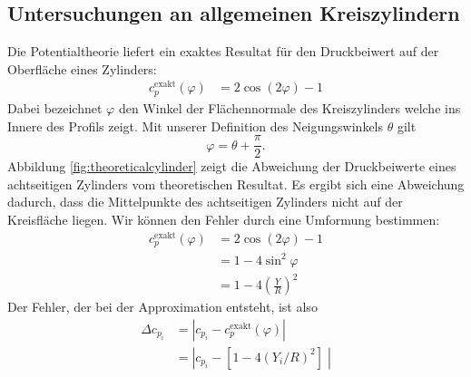 \subsection{Untersuchungen an allgemeinen Kreiszylindern} \label{chap:analyticalcylinder}
Die Potentialtheorie liefert ein exaktes Resultat für den Druckbeiwert auf der Oberfläche eines Zylinders:
\begin{align}
c_p^\mathrm{exakt} (\varphi ) &=  2 \cos{(2\varphi )} -1
\end{align}
Dabei bezeichnet $\varphi$ den Winkel der Flächennormale des Kreiszylinders welche ins Innere des Profils zeigt. Mit unserer Definition des Neigungswinkels $\theta$ gilt
\begin{equation}
\varphi = \theta +  \frac{\pi }{2}.
\end{equation}
Abbildung \ref{fig:theoreticalcylinder} zeigt die Abweichung der Druckbeiwerte eines achtseitigen Zylinders vom theoretischen Resultat. Es ergibt sich eine Abweichung dadurch, dass die Mittelpunkte des achtseitigen Zylinders nicht auf der Kreisfläche liegen. Wir können den Fehler durch eine Umformung bestimmen:
\begin{align}
c_p^\mathrm{exakt} (\varphi ) &=  2 \cos{(2\varphi )} -1 \\
&= 1 - 4 \sin^2 \varphi \\
&= 1 - 4 \left( \frac{Y}{R}\right)^2
\end{align}
Der Fehler, der bei der Approximation entsteht, ist also
\begin{align}
\Delta c_{p_{i}} &= |c_{p_{i}} - c_p^\mathrm{exakt} (\varphi )| \\
&= |c_{p_{i}} -[ 1 - 4 (Y_{i}/R)^2 ] \;|
\end{align}

